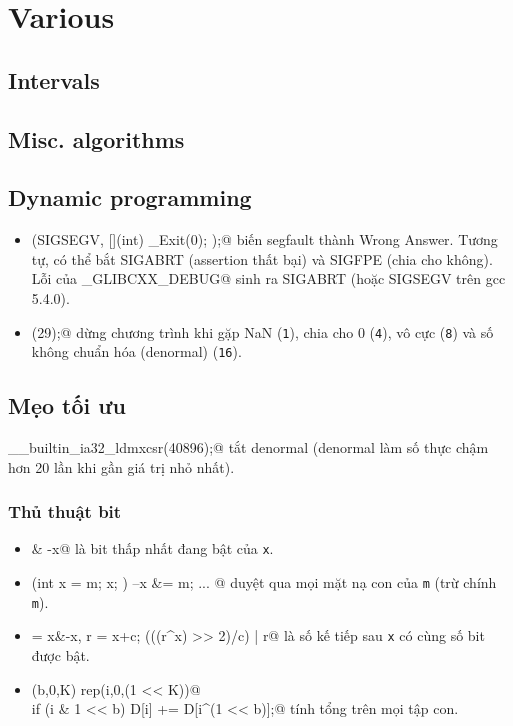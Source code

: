 \chapter{Various}

\section{Intervals}

\section{Misc. algorithms}

\section{Dynamic programming}

\begin{itemize}
		\item \verb@signal(SIGSEGV, [](int) { _Exit(0); });@ biến segfault thành Wrong Answer.
			Tương tự, có thể bắt SIGABRT (assertion thất bại) và SIGFPE (chia cho không).
			Lỗi của \verb@_GLIBCXX_DEBUG@ sinh ra SIGABRT (hoặc SIGSEGV trên gcc 5.4.0).
		\item \verb@feenableexcept(29);@ dừng chương trình khi gặp NaN (\texttt 1), chia cho 0 (\texttt 4), vô cực (\texttt 8) và số không chuẩn hóa (denormal) (\texttt{16}).
	\end{itemize}

\section{Mẹo tối ưu}
	\verb@__builtin_ia32_ldmxcsr(40896);@ tắt denormal (denormal làm số thực chậm hơn 20 lần khi gần giá trị nhỏ nhất).
	\subsection{Thủ thuật bit}
		\begin{itemize}
			\item \verb@x & -x@ là bit thấp nhất đang bật của \texttt{x}.
			\item \verb@for (int x = m; x; ) { --x &= m; ... }@ duyệt qua mọi mặt nạ con của \texttt{m} (trừ chính \texttt{m}).
			\item \verb@c = x&-x, r = x+c; (((r^x) >> 2)/c) | r@ là số kế tiếp sau \texttt{x} có cùng số bit được bật.
			\item \verb@rep(b,0,K) rep(i,0,(1 << K))@ \\ \verb@  if (i & 1 << b) D[i] += D[i^(1 << b)];@ tính tổng trên mọi tập con.
		\end{itemize}
